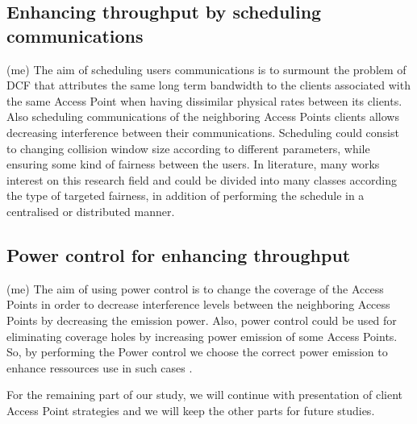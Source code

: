 \documentclass[journal,transmag]{IEEEtran}
\begin{document}
\subsection{Enhancing throughput by scheduling communications} (me)
The aim of scheduling users communications is to surmount the problem of DCF that attributes the same long term bandwidth to the clients associated with the same Access Point when having dissimilar physical rates between its clients. Also scheduling communications of the neighboring Access Points clients allows decreasing interference between their communications. Scheduling could consist to changing collision window size according to different parameters, while ensuring some kind of fairness between the users. In literature, many works interest on this research field \cite{15upstream_schedule_wifi,10splitAP_flexible_sharing,10throughput_performance_varible_load,07proportional_fairness_throughput,13proportional_fairness_channel_access,13centralised_schedule_WLAN,09CENTAUR,06MIFI_fairness_multipel_AP,14group_based_RRM,05IdleSense,06Optimal_CWmin_Selection,14leverage_SDN_openFlow_entreprise_WLAN,15time_fairness_MAC,12Maximising_throughput_time_fairness,05proportional_fairness_WLAN,04time_based_fairness_multirate_WLAN,14interference_fairness_infocom,16rigourous_practical_proportional_fair_AP,11Rigourous_proportional_fairness} and could be divided into many classes according the type of targeted fairness, in addition of performing the schedule in a centralised or distributed manner.   

\subsection{Power control for enhancing throughput} (me)
The aim of using power control is to change the coverage of the Access Points in order to decrease interference levels between the neighboring Access Points by decreasing the emission power. Also, power control could be used for eliminating coverage holes by increasing power emission of some Access Points. So, by performing the Power control we choose the correct power emission to enhance ressources use in such cases \cite{08power_control_fairness_optimisation,07interference_mitigation_power_control,14Gap_free_load_balancing_cell_breathing,08cooperative_load_balancing_cell_breating,09Cell_breathing_Load_balancing_WLAN,07Cell_Breathing}.

For the remaining part of our study, we will continue with presentation of client Access Point strategies and we will keep the other parts for future studies. 
\end{document}
